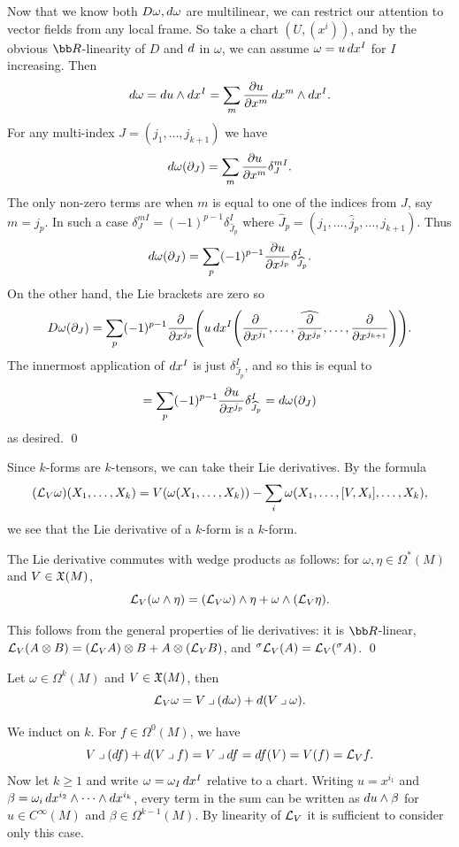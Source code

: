     Now that we know both $D\omega,\mathop{}\!d\omega$ are multilinear, we can restrict our attention to vector fields from any local frame.
    So take a chart $(U,(x^i))$, and by the obvious $\bR$-linearity of $D$ and $\mathop{}\!d$ in $\omega$, we can assume $\omega=u\mathop{}\!d x^I$ for $I$ increasing.
    Then
    $$ \mathop{}\!d\omega = \mathop{}\!d u\wedge\mathop{}\!d x^I = \sum_m{{\partial u}\over{\partial x^m}}\mathop{}\!d x^m\wedge\mathop{}\!d x^I . $$
    For any multi-index $J=(j_1,\dots,j_{k+1})$ we have
    $$ \mathop{}\!d\omega(\partial_J) = \sum_m{{\partial u}\over{\partial x^m}}\delta^{mI}_J . $$
    The only non-zero terms are when $m$ is equal to one of the indices from $J$, say $m=j_p$.
    In such a case $\delta^{mI}_J=(-1)^{p-1}\delta^I_{\hat J_p}$ where $\hat J_p=(j_1,\dots,\hat j_p,\dots,j_{k+1})$.
    Thus
    $$ \mathop{}\!d\omega(\partial_J) = \sum_p(-1)^{p-1}{{\partial u}\over{\partial x^{j_p}}}\delta^I_{\widehat J_p} . $$
    On the other hand, the Lie brackets are zero so
    $$ D\omega(\partial_J) = \sum_p(-1)^{p-1}{{\partial }\over{\partial x^{j_p}}}\mathopen{}\mathclose{\left(u\mathop{}\!d x^I\mathopen{}\mathclose{\left({{\partial }\over{\partial x^{j_1}}},\dots,\widehat{{{\partial }\over{\partial x^{j_p}}}},\dots,{{\partial }\over{\partial x^{j_{k+1}}}}\right)}\right)} . $$
    The innermost application of $\mathop{}\!d x^I$ is just $\delta^I_{\hat J_p}$, and so this is equal to
    $$ = \sum_p(-1)^{p-1}{{\partial u}\over{\partial x^{j_p}}}\delta^I_{\widehat J_p} = \mathop{}\!d\omega(\partial_J) $$
    as desired.
    \qed

\eproof

Since $k$-forms are $k$-tensors, we can take their Lie derivatives.
By the formula
$$ ({{\cal L}}_V\omega)(X_1,\dots,X_k) = V(\omega(X_1,\dots,X_k)) - \sum_i\omega(X_1,\dots,[V,X_i],\dots,X_k) , $$
we see that the Lie derivative of a $k$-form is a $k$-form.

\bprop

    The Lie derivative commutes with wedge products as follows: for $\omega,\eta\in\Omega^*(M)$ and $V\in{\frak X}(M)$,
    $$ {{\cal L}}_V(\omega\wedge\eta) = ({{\cal L}}_V\omega)\wedge\eta + \omega\wedge({{\cal L}}_V\eta) . $$

\eprop

\bproof

    This follows from the general properties of lie derivatives: it is $\bR$-linear, ${{\cal L}}_V(A\otimes B)=({{\cal L}}_VA)\otimes B+A\otimes({{\cal L}}_VB)$, and ${}^\sigma{{\cal L}}_V(A)={{\cal L}}_V({}^\sigma A)$.
    \qed

\eproof

\bthrm[title={Cartan's magic formula}]

    Let $\omega\in\Omega^k(M)$ and $V\in{\frak X}(M)$, then
    $$ \L_V\omega = V\imult(\d\omega) + \d(V\imult\omega) . $$

\ethrm

\bproof

    We induct on $k$.
    For $f\in\Omega^0(M)$, we have
    $$ V\imult(df) + d(V\imult f) = V\imult df = df(V) = V(f) = \L_Vf . $$
    Now let $k\geq1$ and write $\omega=\omega_I\mathop{}\!d x^I$ relative to a chart.
    Writing $u=x^{i_1}$ and $\beta=\omega_i\mathop{}\!d x^{i_2}\wedge\cdots\wedge\mathop{}\!d x^{i_k}$, every term in the sum can be written as $\mathop{}\!d u\wedge\beta$ for $u\in C^\infty(M)$ and $\beta\in\Omega^{k-1}(M)$.
    By linearity of ${{\cal L}}_V$ it is sufficient to consider only this case.

